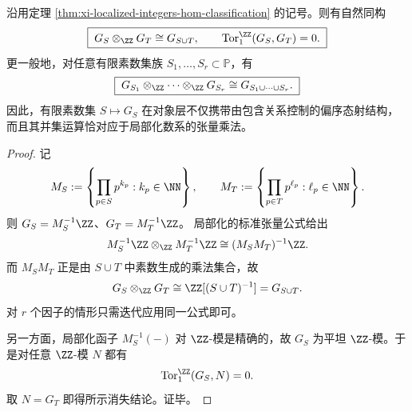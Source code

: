 \begin{theorem}[有限素数局部化数系的张量乘法律]\label{thm:xi-localized-integers-tensor-union-law}
沿用定理 \ref{thm:xi-localized-integers-hom-classification} 的记号。则有自然同构
\[
\boxed{\;
G_S\otimes_{\ZZ}G_T\cong G_{S\cup T},
\qquad
\operatorname{Tor}_1^{\ZZ}(G_S,G_T)=0.\;}
\]
更一般地，对任意有限素数集族 \(S_1,\dots,S_r\subset\mathbb P\)，有
\[
\boxed{\;
G_{S_1}\otimes_{\ZZ}\cdots\otimes_{\ZZ}G_{S_r}
\cong
G_{S_1\cup\cdots\cup S_r}.\;}
\]
因此，有限素数集 \(S\mapsto G_S\) 在对象层不仅携带由包含关系控制的偏序态射结构，而且其并集运算恰对应于局部化数系的张量乘法。
\end{theorem}
\begin{proof}
记
\[
M_S:=\left\{\prod_{p\in S}p^{k_p}:k_p\in\NN\right\},
\qquad
M_T:=\left\{\prod_{p\in T}p^{\ell_p}:\ell_p\in\NN\right\}.
\]
则 \(G_S=M_S^{-1}\ZZ\)、\(G_T=M_T^{-1}\ZZ\)。
局部化的标准张量公式给出
\[
M_S^{-1}\ZZ\otimes_{\ZZ}M_T^{-1}\ZZ
\cong
(M_SM_T)^{-1}\ZZ.
\]
而 \(M_SM_T\) 正是由 \(S\cup T\) 中素数生成的乘法集合，故
\[
G_S\otimes_{\ZZ}G_T\cong \ZZ[(S\cup T)^{-1}]=G_{S\cup T}.
\]
对 \(r\) 个因子的情形只需迭代应用同一公式即可。
\par
另一方面，局部化函子 \(M_S^{-1}(-)\) 对 \(\ZZ\)-模是精确的，故 \(G_S\) 为平坦
\(\ZZ\)-模。于是对任意 \(\ZZ\)-模 \(N\) 都有
\[
\operatorname{Tor}_1^{\ZZ}(G_S,N)=0.
\]
取 \(N=G_T\) 即得所示消失结论。证毕。
\end{proof}











\endinput
